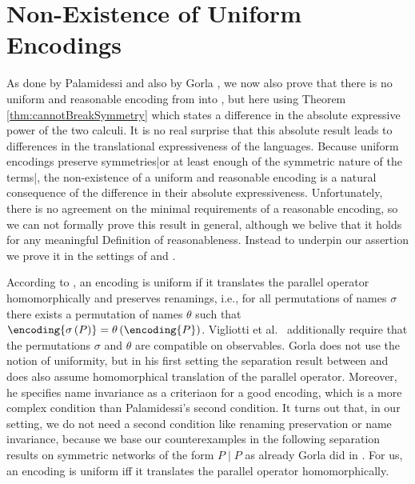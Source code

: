 \documentclass[11pt,techReport]{eptcs}
\begin{document}

\section{Non-Existence of Uniform Encodings} \label{sec:nonExistUniformEncoding}

As done by Palamidessi \cite{palamidessi03} and also by Gorla \cite{gorla08d}, we now also prove that there is no uniform and reasonable encoding from \pimix into \pisep, but here using Theorem \ref{thm:cannotBreakSymmetry} which states a difference in the absolute expressive power of the two calculi.  It is no real surprise that this absolute result leads to differences in the translational expressiveness of the languages. Because uniform encodings preserve symmetries|or at least enough of the symmetric nature of the terms|, the non-existence of a uniform and reasonable encoding is a natural consequence of the difference in their absolute expressiveness. Unfortunately, there is no agreement on the minimal requirements of a reasonable encoding, so we can not formally prove this result in general, although we belive that it holds for any meaningful Definition of reasonableness. Instead to underpin our assertion we prove it in the settings of \cite{palamidessi03} and \cite{gorla08d}.

According to \cite{palamidessi03}, an encoding is uniform if it translates the parallel operator homomorphically and preserves renamings, i.e., for all permutations of names $ \sigma $ there exists a permutation of names $ \theta $ such that $ \encoding{\sigma\left( P \right)} = \theta\left( \encoding{P} \right) $. Vigliotti et al.~\cite{vigliottiPhillipsPalamidessi07} additionally require that the permutations $ \sigma $ and $ \theta $ are compatible on observables. Gorla \cite{gorla08d} does not use the notion of uniformity, but in his first setting the separation result between \pimix and \pisep does also assume homomorphical translation of the parallel operator. Moreover, he specifies name invariance as a criteriaon for a good encoding, which is a more complex condition than  Palamidessi's second condition. It turns out that, in our setting, we do not need a second condition like renaming preservation or name invariance, because we base our counterexamples in the following separation results on symmetric networks of the form $ P \mid P $ as already Gorla did in \cite{gorla08d}.  For us, an encoding is uniform iff it translates the parallel operator homomorphically.
\end{document}
